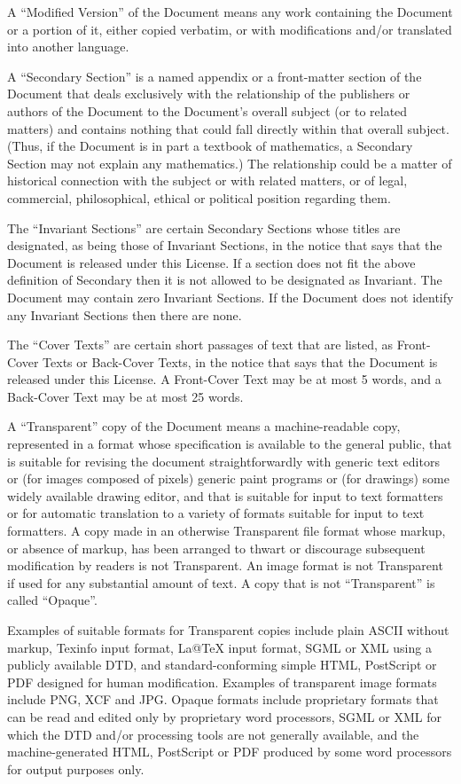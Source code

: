 A ``Modified Version'' of the Document means any work containing the Document or a portion of it, either copied verbatim, or with modifications and/or translated into another language.

A ``Secondary Section'' is a named appendix or a front-matter section of the Document that deals exclusively with the relationship of the publishers or authors of the Document to the Document's overall subject (or to related matters) and contains nothing that could fall directly within that overall subject.  (Thus, if the Document is in part a textbook of mathematics, a Secondary Section may not explain any mathematics.)  The relationship could be a matter of historical connection with the subject or with related matters, or of legal, commercial, philosophical, ethical or political position regarding them.

The ``Invariant Sections'' are certain Secondary Sections whose titles are designated, as being those of Invariant Sections, in the notice that says that the Document is released under this License.  If a section does not fit the above definition of Secondary then it is not allowed to be designated as Invariant.  The Document may contain zero Invariant Sections.  If the Document does not identify any Invariant Sections then there are none.

The ``Cover Texts'' are certain short passages of text that are listed, as Front-Cover Texts or Back-Cover Texts, in the notice that says that the Document is released under this License.  A Front-Cover Text may be at most 5 words, and a Back-Cover Text may be at most 25 words.

A ``Transparent'' copy of the Document means a machine-readable copy, represented in a format whose specification is available to the general public, that is suitable for revising the document straightforwardly with generic text editors or (for images composed of pixels) generic paint programs or (for drawings) some widely available drawing editor, and that is suitable for input to text formatters or for automatic translation to a variety of formats suitable for input to text formatters.  A copy made in an otherwise Transparent file format whose markup, or absence of markup, has been arranged to thwart or discourage subsequent modification by readers is not Transparent. An image format is not Transparent if used for any substantial amount of text.  A copy that is not ``Transparent'' is called ``Opaque''.

Examples of suitable formats for Transparent copies include plain ASCII without markup, Texinfo input format, La@TeX{} input format, SGML or XML using a publicly available DTD, and standard-conforming simple HTML, PostScript or PDF designed for human modification.  Examples of transparent image formats include PNG, XCF and JPG.  Opaque formats include proprietary formats that can be read and edited only by proprietary word processors, SGML or XML for which the DTD and/or processing tools are not generally available, and the machine-generated HTML, PostScript or PDF produced by some word processors for output purposes only.

